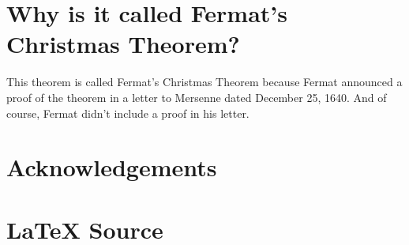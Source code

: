 \documentclass{article}
\theoremstyle{definition}
\begin{document}
\section{Why is it called Fermat's Christmas Theorem?}
This theorem is called Fermat's Christmas Theorem because Fermat
announced a proof of the theorem in a letter to Mersenne dated
December 25, 1640. And of course, Fermat didn't include a proof
in his letter.
%
%
%
\section*{Acknowledgements}
\label{sec:acknowledgements}
%
%
\section*{\LaTeX \hspace{0.025 mm} Source}
\newpage				%
%
%
%


%
%
%
%
%
\end{document}
